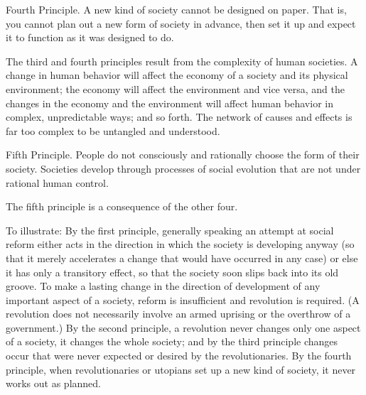  {\sc Fourth Principle.} A new kind of society cannot be designed on paper. That is, you cannot plan out a new form of society in advance, then set it up and expect it to function as it was designed to do.

 The third and fourth principles result from the complexity of human societies. A change in human behavior will affect the economy of a society and its physical environment; the economy will affect the environment and vice versa, and the changes in the economy and the environment will affect human behavior in complex, unpredictable ways; and so forth. The network of causes and effects is far too complex to be untangled and understood.

 {\sc Fifth Principle.} People do not consciously and rationally choose the form of their society. Societies develop through processes of social evolution that are not under rational human control.

 The fifth principle is a consequence of the other four.

 To illustrate: By the first principle, generally speaking an attempt at social reform either acts in the direction in which the society is developing anyway (so that it merely accelerates a change that would have occurred in any case) or else it has only a transitory effect, so that the society soon slips back into its old groove. To make a lasting change in the direction of development of any important aspect of a society, reform is insufficient and revolution is required. (A revolution does not necessarily involve an armed uprising or the overthrow of a government.) By the second principle, a revolution never changes only one aspect of a society, it changes the whole society; and by the third principle changes occur that were never expected or desired by the revolutionaries. By the fourth principle, when revolutionaries or utopians set up a new kind of society, it never works out as planned.

